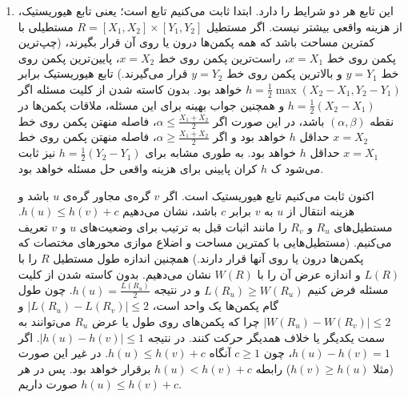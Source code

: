 \documentclass{article}
\begin{document}
\begin{enumerate}
	\item
	این تابع هر دو شرایط را دارد. ابتدا ثابت می‌‌کنیم تابع 
	است؛ یعنی تابع هیوریستیک، از هزینه واقعی بیشتر نیست. اگر مستطیل
	$R = [X_1, X_2] \times [Y_1, Y_2]$
	مستطیلی با کمترین مساحت باشد که همه پکمن‌ها درون یا روی آن قرار بگیرند، (چپ‌ترین پکمن روی خط $ x = X_1 $، راست‌ترین پکمن روی خط $ x = X_2 $، پایین‌ترین پکمن روی خط $ y = Y_1 $ و بالاترین پکمن روی خط $ y = Y_2 $ قرار می‌گیرند.) تابع هیوریستیک برابر 
	$h = \frac{1}{2}\max(X_2 - X_1, Y_2 - Y_1)$
	خواهد بود. بدون کاسته شدن از کلیت مسئله اگر 
	$h = \frac{1}{2}(X_2 - X_1)$
	و همچنین جواب بهینه برای این مسئله، ملاقات پکمن‌ها در نقطه 
	$(\alpha, \beta)$
	باشد، در این صورت اگر $\alpha \leq \frac{X_1 + X_2}{2}$، فاصله منهتن 
	پکمن روی خط 
	$x = X_2$
	حداقل $h$ خواهد بود و اگر $\alpha \geq \frac{X_1 + X_2}{2}$، فاصله منهتن پکمن روی خط 
	$x = X_1$
	حداقل $h$ خواهد بود. به طوری مشابه برای 
	$h = \frac{1}{2}(Y_2 - Y_1)$
	نیز ثابت می‌شود ک $h$ کران پایینی برای هزینه واقعی حل مسئله خواهد بود.
	
	اکنون ثابت می‌کنیم تابع هیوریستیک 
	است. اگر $v$ گره‌ی مجاور گره‌ی $u$ باشد و هزینه انتقال از $u$ به $v$ برابر $c$ باشد، نشان می‌دهیم 
	$h(u) \leq h(v) + c$.
مستطیل‌های $ R_u $ و $ R_v $ را مانند اثبات قبل به ترتیب برای وضعیت‌های $u$ و $v$ تعریف می‌کنیم. (مستطیل‌هایی با کمترین مساحت و اضلاع موازی محور‌های مختصات که پکمن‌ها درون یا روی آنها قرار دارند.) همچنین اندازه طول مستطیل $R$ را با $L(R)$ و اندازه عرض آن را با $W(R)$ نشان می‌دهیم. بدون کاسته شدن از کلیت مسئله فرض کنیم 
	$L(R_u) \geq W(R_u)$
و در نتیجه 
$h(u) = \frac{L(R_u)}{2}$.
چون طول گام پکمن‌ها یک واحد است،
$|L(R_u) - L(R_v)| \leq 2$
و
$|W(R_u) - W(R_v)| \leq 2$
چرا که پکمن‌های روی طول یا عرض $R_u$ می‌توانند به سمت یکدیگر یا خلاف همدیگر حرکت کنند. در نتیجه 
$|h(u) - h(v)| \leq 1$.
 اگر $h(u) - h(v) = 1$، چون $ c \geq 1 $ آنگاه 
 $h(u) \leq h(v) + c$. 
 در غیر این صورت (مثلا $h(v) \geq h(u)$) رابطه
  $h(u) < h(v) + c$
   برقرار خواهد بود. پس در هر صورت داریم 
   $h(u) \leq h(v) + c$.

	\end{enumerate}
\end{document}
